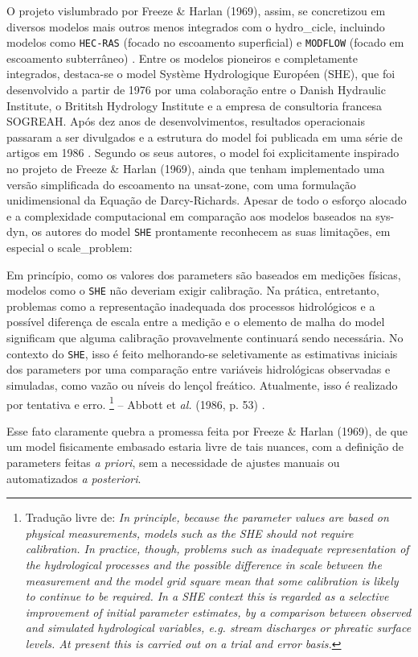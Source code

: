 \documentclass[./main.tex]{subfiles}
\begin{document}
\par O projeto vislumbrado por Freeze \& Harlan (1969), assim, se concretizou em diversos modelos mais outros menos integrados com o \gls{hydro_cicle}, incluindo modelos como \texttt{HEC-RAS} (focado no escoamento superficial) e \texttt{MODFLOW} (focado em escoamento subterrâneo) \cite{Simmons2020a}. Entre os modelos pioneiros e completamente integrados, destaca-se o \gls{model} Système Hydrologique Européen (SHE), que foi desenvolvido a partir de 1976 por uma colaboração entre o Danish Hydraulic Institute, o Brititsh Hydrology Institute e a empresa de consultoria francesa SOGREAH. Após dez anos de desenvolvimentos, resultados operacionais passaram a ser divulgados e a estrutura do \gls{model} foi publicada em uma série de artigos em 1986 \cite{Abbott1986a, Abbott1986b}. Segundo os seus autores, o \gls{model} foi explicitamente inspirado no projeto de Freeze \& Harlan (1969), ainda que tenham implementado uma versão simplificada do escoamento na \gls{unsat-zone}, com uma formulação unidimensional da Equação de Darcy-Richards. Apesar de todo o esforço alocado e a complexidade computacional em comparação aos modelos baseados na \gls{sys-dyn}, os autores do \gls{model} \texttt{SHE} prontamente reconhecem as suas limitações, em especial o \gls{scale_problem}:
\begin{adjustwidth}{100pt}{0pt}
\medskip
\small
Em princípio, como os valores dos \gls{parameters} são baseados em medições físicas, modelos como o \texttt{SHE} não deveriam exigir calibração. Na prática, entretanto, problemas como a representação inadequada dos processos hidrológicos e a possível diferença de escala entre a medição e o elemento de malha do \gls{model} significam que alguma calibração provavelmente continuará sendo necessária. No contexto do \texttt{SHE}, isso é feito melhorando-se seletivamente as estimativas iniciais dos \gls{parameters} por uma comparação entre variáveis hidrológicas observadas e simuladas, como vazão ou níveis do lençol freático. Atualmente, isso é realizado por tentativa e erro.
\footnote{Tradução livre de: 
\textit{
In principle, because the parameter values are based on physical measurements, models such as the SHE should not require calibration. In practice, though, problems such as inadequate representation of the hydrological processes and the possible difference in scale between the measurement and the model grid square mean that some calibration is likely to continue to be required. In a SHE context this is regarded as a selective improvement of initial parameter estimates, by a comparison between observed and simulated hydrological variables, e.g. stream discharges or phreatic surface levels. At present this is carried out on a trial and error basis. 
}} -- Abbott et \textit{al.} (1986, p. 53) \cite{Abbott1986a}.
\medskip
\end{adjustwidth}
\noindent Esse fato claramente quebra a promessa feita por Freeze \& Harlan (1969), de que um \gls{model} fisicamente embasado estaria livre de tais nuances, com a definição de \gls{parameters} feitas \textit{a priori}, sem a necessidade de ajustes manuais ou automatizados \textit{a posteriori}. 
\end{document}
